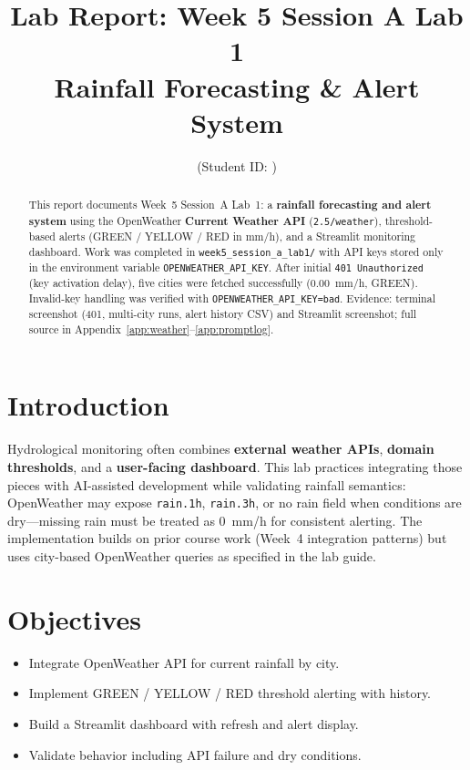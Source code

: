 \documentclass[11pt,a4paper]{article}
\title{Lab Report: Week 5 Session A Lab 1\\Rainfall Forecasting \& Alert System}
\author{\studentname \quad (Student ID: \studentid)}
\date{\reportdate}
\begin{document}
\maketitle

\begin{abstract}
This report documents Week~5 Session~A Lab~1: a \textbf{rainfall forecasting and alert system} using the OpenWeather \textbf{Current Weather API} (\texttt{2.5/weather}), threshold-based alerts (GREEN / YELLOW / RED in mm/h), and a Streamlit monitoring dashboard. Work was completed in \texttt{week5\_session\_a\_lab1/} with API keys stored only in the environment variable \texttt{OPENWEATHER\_API\_KEY}. After initial \texttt{401 Unauthorized} (key activation delay), five cities were fetched successfully (0.00~mm/h, GREEN). Invalid-key handling was verified with \texttt{OPENWEATHER\_API\_KEY=bad}. Evidence: terminal screenshot (401, multi-city runs, alert history CSV) and Streamlit screenshot; full source in Appendix~\ref{app:weather}--\ref{app:promptlog}.
\end{abstract}

\section{Introduction}
Hydrological monitoring often combines \textbf{external weather APIs}, \textbf{domain thresholds}, and a \textbf{user-facing dashboard}. This lab practices integrating those pieces with AI-assisted development while validating rainfall semantics: OpenWeather may expose \texttt{rain.1h}, \texttt{rain.3h}, or no rain field when conditions are dry---missing rain must be treated as 0~mm/h for consistent alerting. The implementation builds on prior course work (Week~4 integration patterns) but uses city-based OpenWeather queries as specified in the lab guide.

\section{Objectives}
\begin{itemize}[noitemsep]
  \item Integrate OpenWeather API for current rainfall by city.
  \item Implement GREEN / YELLOW / RED threshold alerting with history.
  \item Build a Streamlit dashboard with refresh and alert display.
  \item Validate behavior including API failure and dry conditions.
\end{itemize}
\end{document}
